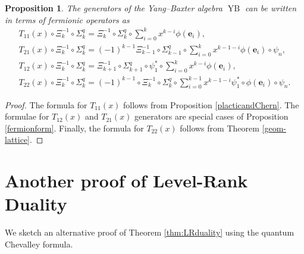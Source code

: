 \documentclass[12pt]{amsart}
\newcommand{\bs}[1]{\boldsymbol{#1}}
\newtheorem{prop}{Proposition}[section]
\numberwithin{equation}{section}
\numberwithin{figure}{section}
\newcommand{\YB}{\operatorname{YB}}
\begin{document}
\begin{prop}
    The generators of the Yang--Baxter algebra $\YB$ can be written in terms of fermionic operators as
    \begin{equation*}
    \begin{array}{l}
    T_{11}(x) \circ \Xi_k^{-1} \circ \Sigma_k^q = \Xi_k^{-1} \circ \Sigma^q_k \circ \sum\limits_{i = 0}^k x^{k - i} \phi(\bs{e}_i), \\
    T_{21}(x) \circ \Xi_k^{-1} \circ \Sigma_k^q =(-1)^{k - 1}  \Xi_{k-1}^{-1} \circ \Sigma^q_{k-1} \circ \sum\limits_{i = 0}^k x^{k - 1 - i} \phi(\bs{e}_i) \circ \psi_n, \\
    T_{12}(x) \circ \Xi_k^{-1} \circ \Sigma_k^q  = \Xi_{k+1}^{-1} \circ \Sigma^q_{k+1} \circ \psi^*_1\circ \sum\limits_{i = 0}^k x^{k - i} \phi(\bs{e}_i) , \\
    T_{22}(x) \circ \Xi_k^{-1} \circ \Sigma_k^q = (-1)^{k - 1} \circ \Xi_k^{-1} \circ \Sigma_k^q \circ \sum\limits_{i = 0}^{k-1} x^{k - 1 - i} \psi^*_1 \circ \phi(\bs{e}_i) \circ \psi_n . 
    \end{array}
    \end{equation*}
\end{prop}
\begin{proof}
    The formula for $T_{11}(x)$ follows from Proposition \ref{placticandChern}. The formulae for $T_{12}(x)$ and $T_{21}(x)$ generators are special cases of Proposition \ref{fermionform}. Finally, the formula for $T_{22}(x)$ follows from Theorem \ref{geom-lattice}.
\end{proof}
\section{Another proof of Level-Rank Duality}

We sketch an alternative proof of Theorem \ref{thm:LRduality} using the quantum Chevalley formula. 
\end{document}
